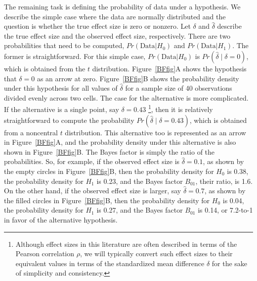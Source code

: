 \documentclass[man]{apa6}
\begin{document}
The remaining task is defining the probability of data under a hypothesis.  We describe the simple case where the data are normally distributed and the question is whether the true effect size is zero or nonzero.  Let $\delta$ and $\hat{\delta}$ describe the true effect size and the observed effect size, respectively.  There are two probabilities that need to be computed,   $Pr(\mbox{Data} | H_0)$ and $Pr(\mbox{Data} | H_1)$.   The former is straightforward.  For this simple case, $Pr(\mbox{Data} | H_0)$ is $Pr(\hat{\delta} \mid \delta=0)$, which is obtained from the $t$ distribution.  Figure~\ref{BFfig}A shows the hypothesis that $\delta=0$ as an arrow at zero.  Figure~\ref{BFfig}B shows the probability density under this hypothesis for all values of $\hat{\delta}$ for a sample size of 40 observations divided evenly across two cells. The case for the alternative is more complicated.  If the alternative is a single point, say $\delta=0.43$ \citep[here chosen as an example because $\delta = 0.43$ is the effect size of violent games on aggressive behaviors as described by][]{Anderson:etal:2010}\footnote{Although effect sizes in this literature are often described in terms of the Pearson correlation $\rho$, we will typically convert such effect sizes to their equivalent values in terms of the standardized mean difference $\delta$ for the sake of simplicity and consistency.}, then it is relatively straightforward to compute the probability $Pr(\hat{\delta} \mid \delta=0.43)$, which is obtained from a noncentral $t$ distribution.   This alternative too is represented as an arrow in Figure~\ref{BFfig}A, and the probability density under this alternative is also shown in Figure~\ref{BFfig}B. The Bayes factor is simply the ratio of the probabilities.  So, for example, if the observed effect size is $\hat{\delta} = 0.1$, as shown by the empty circles in Figure~\ref{BFfig}B, then the probability density for $H_0$ is 0.38, the probability density for $H_1$ is 0.23, and the Bayes factor $B_{01}$, their ratio, is 1.6. On the other hand, if the observed effect size is larger, say $\hat{\delta} = 0.7$, as shown by the filled circles in Figure~\ref{BFfig}B, then the probability density for $H_0$ is 0.04, the probability density for $H_1$ is 0.27, and the Bayes factor $B_{01}$ is 0.14, or 7.2-to-1 in favor of the alternative hypothesis.
\end{document}
